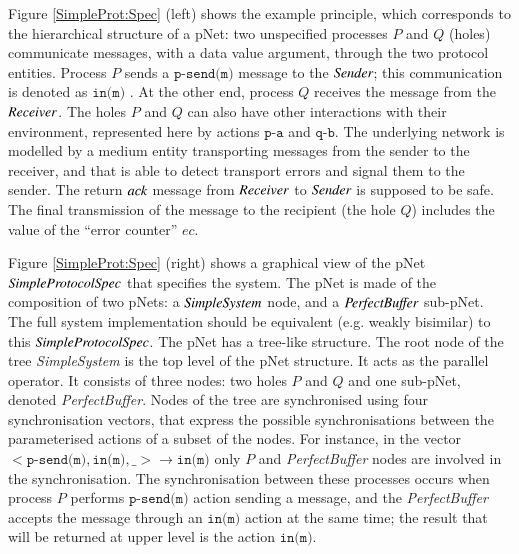 \documentclass{elsarticle}
\newcommand{\nounderline}[1]{#1}
\begin{document}
Figure \ref{SimpleProt:Spec} (left) shows the example principle, which corresponds to the hierarchical structure of a pNet: two unspecified
processes $P$ and $Q$ (holes) communicate messages, with a data value
argument, through the two protocol entities. Process $P$ sends a $\texttt{p-send(m)}$ message to the $\symb{Sender}$; this communication is denoted as $\texttt{\nounderline{in(m)}}$%
.
At the other end, process $Q$ receives the message from the $\symb{Receiver}$. The holes $P$ and $Q$ can also have other interactions with their environment, represented here by actions $\texttt{p-a}$ and $\texttt{q-b}$. The underlying network is modelled by a medium entity transporting messages from the sender to the receiver, and that is able to detect transport errors and signal them to the sender. The return $\symb{ack}$ message from $\symb{Receiver}$ to $\symb{Sender}$ is supposed to be safe. The final transmission of the message to the recipient (the hole $Q$) includes the value of the ``error counter'' $ec$.


Figure \ref{SimpleProt:Spec} (right) shows a graphical view of the pNet $\symb{SimpleProtocolSpec}$ that specifies the system. The pNet is made of the composition of two pNets: a $\symb{SimpleSystem}$ node, and a $\symb{PerfectBuffer}$ sub-pNet. 
The full system implementation should be equivalent (e.g.  weakly bisimilar)
to this $\symb{SimpleProtocolSpec}$.  
The pNet has a tree-like structure.  The root node of the tree {\it SimpleSystem} is the top level of the pNet structure. It acts as the parallel operator. It consists of three nodes: two holes $P$ and $Q$ and one sub-pNet, denoted {\it PerfectBuffer}. Nodes of the tree are synchronised using four synchronisation vectors, that  express the possible synchronisations between the parameterised actions of a subset of the nodes. For instance, in the vector $< \texttt{p-send(m)},\texttt{in(m)},\_> \rightarrow \texttt{\nounderline{in(m)}}$ only $P$ and {\it PerfectBuffer} nodes are involved in the synchronisation. The synchronisation between these processes occurs when  process $P$  performs $\texttt{p-send(m)}$  action sending a message, and  the {\it PerfectBuffer} accepts the message through an $\texttt{in(m)}$ action  at the same time; the result that will be returned at upper level is the action  $\texttt{\nounderline{in(m)}}$.
\end{document}

